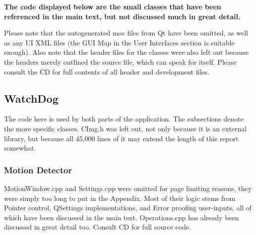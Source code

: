 {\bf The code displayed below are the small classes that have been referenced in the main text, but not discussed much in great detail.}

Please note that the autogenerated moc files from Qt have been omitted, as well as any UI XML files (the GUI Map in the User Interfaces section is suitable enough).  Also note that the header files for the classes were also left out because the headers merely outlined the source file, which can speak for itself. Please consult the CD for full contents of all header and development files.

\subsection{WatchDog}
The code here is used by both parts of the application. The subsections denote the more specific classes.
CImg.h was left out, not only because it is an external library, but because all 45,000 lines of it may extend the length of this report somewhat.

%
%
%
%
%
%
%

\begin{frame}{}

\end{frame}


\subsubsection{Motion Detector}
MotionWindow.cpp and Settings.cpp were omitted for page limiting reasons, they were simply too long to put in the Appendix. Most of their logic stems from Pointer control, QSettings implementations, and Error proofing user-inputs, all of which have been discussed in the main text.  Operations.cpp has already been discussed in great detail too. Consult CD for full source code.

